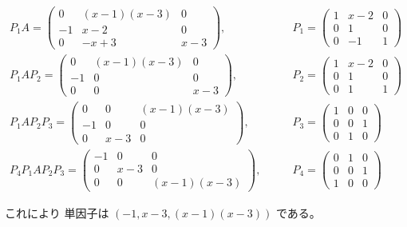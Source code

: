 \documentclass[12pt,b5paper]{ltjsarticle}
\begin{document}
\begin{enumerate}
      
      \begin{align}
       P_{1} A=
        \begin{pmatrix}
         0 & (x-1)(x-3) & 0 \\
         -1 & x-2 & 0 \\
         0 & -x+3 & x-3
        \end{pmatrix},
        &\qquad
        P_{1} =
        \begin{pmatrix}
         1 & x-2 & 0 \\
         0 & 1 & 0 \\
         0 & -1 & 1
        \end{pmatrix}
       \\
       P_{1} A P_{2}=
        \begin{pmatrix}
         0 & (x-1)(x-3) & 0 \\
         -1 & 0 & 0 \\
         0 & 0 & x-3
        \end{pmatrix},
        &\qquad
        P_{2} =
        \begin{pmatrix}
         1 & x-2 & 0 \\
         0 & 1 & 0 \\
         0 & 1 & 1
        \end{pmatrix}
       \\
       P_{1} A P_{2} P_{3}=
        \begin{pmatrix}
         0 & 0 & (x-1)(x-3) \\
         -1 & 0 & 0 \\
         0 & x-3 & 0
        \end{pmatrix},
        &\qquad
        P_{3} =
        \begin{pmatrix}
         1 & 0 & 0 \\
         0 & 0 & 1 \\
         0 & 1 & 0
        \end{pmatrix}
       \\
       P_{4} P_{1} A P_{2} P_{3}=
        \begin{pmatrix}
         -1 & 0 & 0 \\
         0 & x-3 & 0 \\
         0 & 0 & (x-1)(x-3)
        \end{pmatrix},
        &\qquad
        P_{4} =
        \begin{pmatrix}
         0 & 1 & 0 \\
         0 & 0 & 1 \\
         1 & 0 & 0
        \end{pmatrix}
      \end{align}

      これにより
      単因子は
      $(-1,x-3,(x-1)(x-3))$
      である。


\end{enumerate}

\hrulefill
\end{document}
